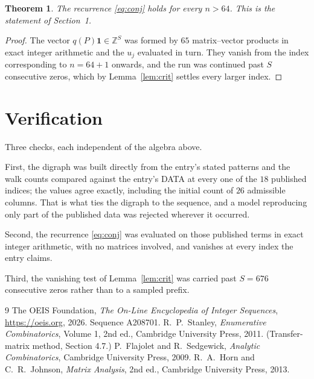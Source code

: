 \documentclass[11pt,a4paper]{article}
\theoremstyle{plain}
\newtheorem{theorem}{Theorem}
\theoremstyle{definition}
\begin{document}
\begin{theorem}
The recurrence \eqref{eq:conj} holds for every $n>64$. This is the statement of
Section~1.
\end{theorem}

\begin{proof}
The vector $q(P)\mathbf{1}\in\mathbb{Z}^{S}$ was formed by $65$ matrix--vector
products in exact integer arithmetic and the $u_j$ evaluated in turn. They vanish from the
index corresponding to $n=64+1$ onwards, and the run was continued past $S$ consecutive
zeros, which by Lemma~\ref{lem:crit} settles every larger index.
\end{proof}

\section{Verification}

Three checks, each independent of the algebra above.

First, the digraph was built directly from the entry's stated patterns and the walk counts
compared against the entry's DATA at every one of the $18$ published indices; the
values agree exactly, including the initial count of $26$ admissible columns. That is
what ties the digraph to the sequence, and a model reproducing only part of the published
data was rejected wherever it occurred.

Second, the recurrence \eqref{eq:conj} was evaluated on those published terms in exact
integer arithmetic, with no matrices involved, and vanishes at every index the entry claims.

Third, the vanishing test of Lemma~\ref{lem:crit} was carried past $S=676$ consecutive
zeros rather than to a sampled prefix.

\begin{thebibliography}{9}
 The OEIS Foundation, \emph{The On-Line Encyclopedia of Integer
Sequences}, \url{https://oeis.org}, 2026. Sequence A208701.
 R.~P.~Stanley, \emph{Enumerative Combinatorics}, Volume 1, 2nd ed.,
Cambridge University Press, 2011. (Transfer-matrix method, Section 4.7.)
 P.~Flajolet and R.~Sedgewick, \emph{Analytic Combinatorics}, Cambridge
University Press, 2009.
 R.~A.~Horn and C.~R.~Johnson, \emph{Matrix Analysis}, 2nd ed., Cambridge
University Press, 2013.
\end{thebibliography}
\end{document}
